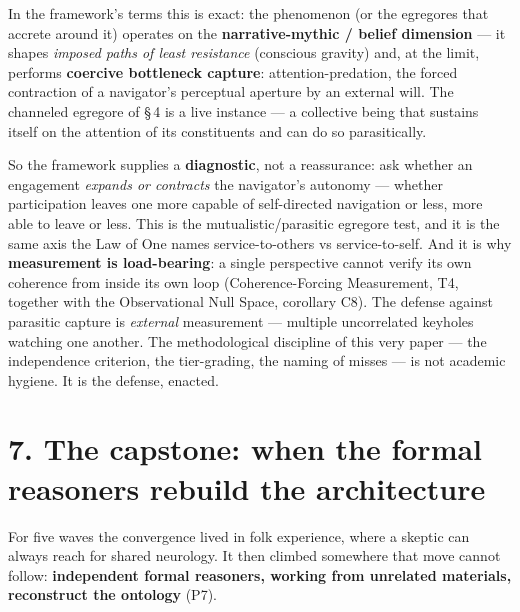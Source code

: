 \documentclass[11pt]{article}
\begin{document}
In the framework's terms this is exact: the phenomenon (or the egregores that accrete around it) operates on the \textbf{narrative-mythic / belief dimension} --- it shapes \emph{imposed paths of least resistance} (conscious gravity) and, at the limit, performs \textbf{coercive bottleneck capture}: attention-predation, the forced contraction of a navigator's perceptual aperture by an external will. The channeled egregore of \S\,4 is a live instance --- a collective being that sustains itself on the attention of its constituents and can do so parasitically.

So the framework supplies a \textbf{diagnostic}, not a reassurance: ask whether an engagement \emph{expands or contracts} the navigator's autonomy --- whether participation leaves one more capable of self-directed navigation or less, more able to leave or less. This is the mutualistic/parasitic egregore test, and it is the same axis the Law of One names service-to-others vs service-to-self. And it is why \textbf{measurement is load-bearing}: a single perspective cannot verify its own coherence from inside its own loop (Coherence-Forcing Measurement, T4, together with the Observational Null Space, corollary C8). The defense against parasitic capture is \emph{external} measurement --- multiple uncorrelated keyholes watching one another. The methodological discipline of this very paper --- the independence criterion, the tier-grading, the naming of misses --- is not academic hygiene. It is the defense, enacted.

\section*{7. The capstone: when the formal reasoners rebuild the architecture}
For five waves the convergence lived in folk experience, where a skeptic can always reach for shared neurology. It then climbed somewhere that move cannot follow: \textbf{independent formal reasoners, working from unrelated materials, reconstruct the ontology} (P7).
\end{document}
